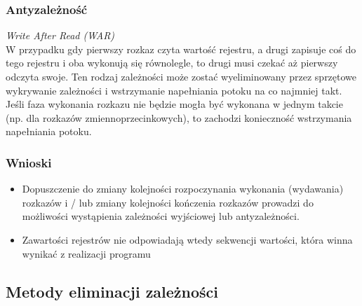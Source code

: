 \documentclass[a4paper,twoside]{article}
\begin{document}
\subsubsection{Antyzależność}
\emph{Write After Read (WAR)}\\
W przypadku gdy pierwszy rozkaz czyta wartość rejestru, a drugi zapisuje coś do tego rejestru i oba wykonują się równolegle, to drugi musi czekać aż pierwszy odczyta swoje. Ten rodzaj zależności może zostać wyeliminowany przez sprzętowe wykrywanie zależności i wstrzymanie napełniania potoku na co najmniej takt.\\
Jeśli faza wykonania rozkazu nie będzie mogła być wykonana w jednym takcie (np. dla rozkazów zmiennoprzecinkowych), to zachodzi konieczność wstrzymania napełniania potoku.
\subsubsection{Wnioski}
\begin{samepage}
	\begin{itemize}
		\item Dopuszczenie do zmiany kolejności rozpoczynania wykonania (wydawania) rozkazów i / lub zmiany kolejności kończenia rozkazów prowadzi do możliwości wystąpienia zależności wyjściowej lub antyzależności.
		\item Zawartości rejestrów nie odpowiadają wtedy sekwencji wartości, która winna wynikać z realizacji programu
	\end{itemize}
\end{samepage}

\subsection{Metody eliminacji zależności}
\end{document}
